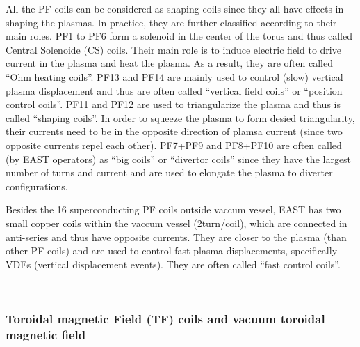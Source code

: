 \documentclass{llncs}
\begin{document}
All the PF coils can be considered as shaping coils since they all have
effects in shaping the plasmas. In practice, they are further classified
according to their main roles. PF1 to PF6 form a solenoid in the center of the
torus and thus called Central Solenoide (CS) coils. Their main role is to
induce electric field to drive current in the plasma and heat the plasma. As a
result, they are often called ``Ohm heating coils''. PF13 and PF14 are mainly
used to control (slow) vertical plasma displacement and thus are often called
``vertical field coils'' or ``position control coils''. PF11 and PF12 are used
to triangularize the plasma and thus is called ``shaping coils''. In order to
squeeze the plasma to form desied triangularity, their currents need to be in
the opposite direction of plamsa current (since two opposite currents repel
each other). PF7+PF9 and PF8+PF10 are often called (by EAST operators) as
``big coils'' or ``divertor coils'' since they have the largest number of
turns and current and are used to elongate the plasma to diverter
configurations.

Besides the 16 superconducting PF coils outside vaccum vessel, EAST has two
small copper coils within the vaccum vessel (2turn/coil), which are connected
in anti-series and thus have opposite currents. They are closer to the plasma
(than other PF coils) and are used to control fast plasma displacements,
specifically VDEs (vertical displacement events). They are often called ``fast
control coils''.

\

\subsubsection{Toroidal magnetic Field (TF) coils and vacuum toroidal
magnetic field}
\end{document}
